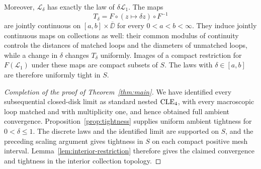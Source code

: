 Moreover, $\mathcal L_\delta$ has exactly the law of $\delta\mathcal L_1$. The maps
\[
 T_\delta=F\circ(z\mapsto\delta z)\circ F^{-1}
\]
are jointly continuous on $[a,b]\times\overline\DD$ for every $0<a<b<\infty$. They induce jointly continuous maps on collections as well: their common modulus of continuity controls the distances of matched loops and the diameters of unmatched loops, while a change in $\delta$ changes $T_\delta$ uniformly. Images of a compact restriction for $F(\mathcal L_1)$ under these maps are compact subsets of $S$. The laws with $\delta\in[a,b]$ are therefore uniformly tight in $S$.

\begin{proof}[Completion of the proof of Theorem~\ref{thm:main}]
We have identified every subsequential closed-disk limit as standard nested $\mathrm{CLE}_4$, with every macroscopic loop matched and with multiplicity one, and hence obtained full ambient convergence. Proposition~\ref{prop:tightness} supplies uniform ambient tightness for $0<\delta\le1$. The discrete laws and the identified limit are supported on $S$, and the preceding scaling argument gives tightness in $S$ on each compact positive mesh interval. Lemma~\ref{lem:interior-restriction} therefore gives the claimed convergence and tightness in the interior collection topology.
\end{proof}
